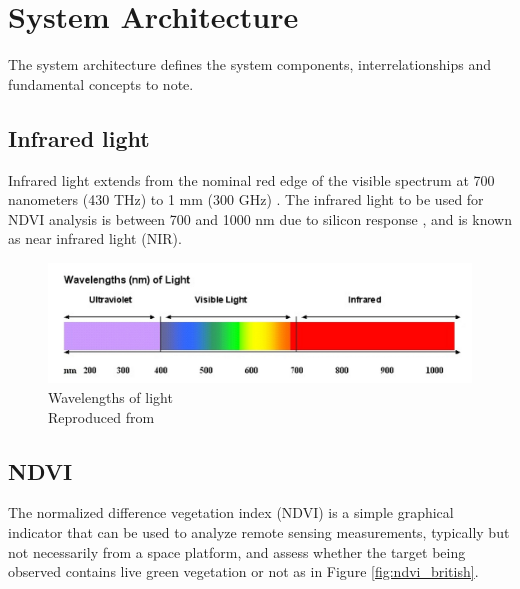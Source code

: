 \chapter{System Architecture}

The system architecture defines the system components, interrelationships and fundamental concepts to note.

\section{Infrared light}

Infrared light extends from the nominal red edge of the visible spectrum at 700 nanometers (430 THz) to 1 mm (300 GHz) \cite{ir_wiki}. The infrared light to be used for NDVI analysis is between 700 and 1000 nm due to silicon response \cite{ir_wiki}, and is known as near infrared light (NIR).

\begin{figure}[H]
\centering
\includegraphics[scale=0.35]{images/ir_spectrum.png}
\caption{Wavelengths of light\\
Reproduced from \cite{ir_spectrum}}
\label{fig:ir_spectrum}
\end{figure}

\section{NDVI}

The normalized difference vegetation index (NDVI) is a simple graphical indicator that can be used to analyze remote sensing measurements, typically but not necessarily from a space platform, and assess whether the target being observed contains live green vegetation or not\cite{ndvi_wiki} as in Figure \ref{fig:ndvi_british}.

